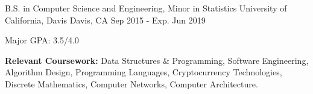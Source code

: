 

\begin{cventries}

  \cventry
    {B.S. in Computer Science and Engineering, Minor in Statistics} %
    {University of California, Davis} %
    {Davis, CA} %
    {Sep 2015 - Exp. Jun 2019} %
    {
      \begin{cvitems} %
        \item {Major GPA: 3.5/4.0}
      \end{cvitems}
    }

\end{cventries}

\begin{cvparagraph}
  \textbf{Relevant Coursework: } Data Structures \& Programming, Software Engineering, Algorithm Design, Programming Languages, Cryptocurrency Technologies, Discrete Mathematics, Computer Networks, Computer Architecture.
\end{cvparagraph}
